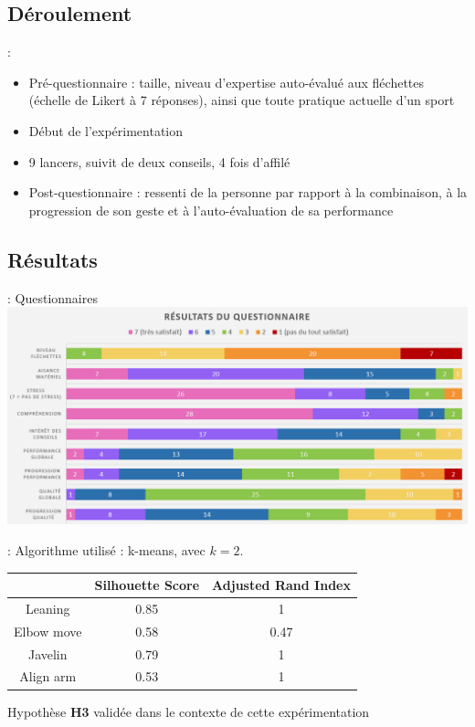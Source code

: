 \documentclass[svgnames]{beamer}
\begin{document}
	\subsection{Déroulement}
	\begin{frame}{\secname : \subsecname}
		\begin{itemize}[label=$\bullet$]
			\item Pré-questionnaire : taille, niveau d'expertise auto-évalué aux fléchettes (échelle de Likert à 7 réponses), ainsi que toute pratique actuelle d'un sport
			\item Début de l'expérimentation
			\item 9 lancers, suivit de deux conseils, 4 fois d'affilé
			\item Post-questionnaire : ressenti de la personne par rapport à la combinaison, à la progression de son geste et à l'auto-évaluation de sa performance
		\end{itemize}
		
	\end{frame}
	
	\subsection{Résultats}
	\begin{frame}{\subsecname : Questionnaires}
	\centering
		\includegraphics[scale=0.4]{img/graph_questionnaires.png}
	\end{frame}		
	
	\begin{frame}{\secname : \subsecname}
	Algorithme utilisé : k-means, avec $k=2$.
	
	\begin{table}[h]
		\centering
		\begin{tabular}{c|c|c}
			& Silhouette Score & Adjusted Rand Index\\\hline
			Leaning & 0.85 & 1\\
			Elbow move & 0.58 & 0.47\\
			Javelin & 0.79 & 1\\
			Align arm & 0.53 & 1\\
		\end{tabular}
	\end{table}
		
		Hypothèse \textbf{H3} validée dans le contexte de cette expérimentation
		
	\end{frame}
	
\end{document}
